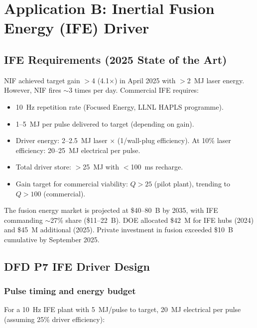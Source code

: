 \documentclass[11pt]{article}
\begin{document}
\section{Application B: Inertial Fusion Energy (IFE) Driver}
\label{sec:IFE}

\subsection{IFE Requirements (2025 State of the Art)}

NIF achieved target gain $>$4 (4.1$\times$) in April 2025 with
$>$2~MJ laser energy. However, NIF fires $\sim$3 times per day.
Commercial IFE requires:
\begin{itemize}[nosep]
  \item 10~Hz repetition rate (Focused Energy, LLNL HAPLS programme).
  \item 1--5~MJ per pulse delivered to target (depending on gain).
  \item Driver energy: 2--2.5~MJ laser $\times$ (1/wall-plug efficiency).
    At 10\% laser efficiency: 20--25~MJ electrical per pulse.
  \item Total driver store: $>$25~MJ with $<$100~ms recharge.
  \item Gain target for commercial viability: $Q > 25$ (pilot plant),
    trending to $Q > 100$ (commercial).
\end{itemize}

The fusion energy market is projected at \$40--80~B by 2035, with IFE
commanding $\sim$27\% share (\$11--22~B). DOE allocated \$42~M for IFE
hubs (2024) and \$45~M additional (2025). Private investment in fusion
exceeded \$10~B cumulative by September 2025.

\subsection{DFD P7 IFE Driver Design}

\subsubsection{Pulse timing and energy budget}

For a 10~Hz IFE plant with 5~MJ/pulse to target, 20~MJ electrical per
pulse (assuming 25\% driver efficiency):
\end{document}
